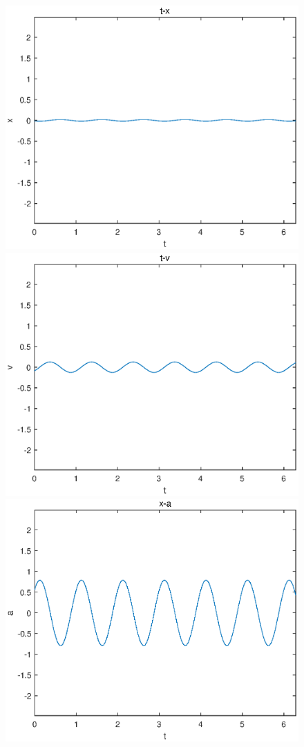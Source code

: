 \documentclass{article}
\begin{document}
\begin{figure}[!h]\centering
\includegraphics[width=.9\textwidth]{9-7-x.eps}
\includegraphics[width=.9\textwidth]{9-7-v.eps}
\includegraphics[width=.9\textwidth]{9-7-a.eps}
\end{figure}\\
\end{document}
